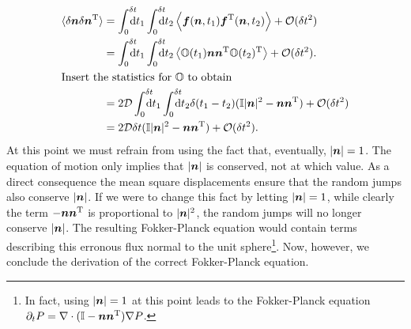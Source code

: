 \documentclass[thesis.tex]{subfiles}
\begin{document}
\begin{align}
	\langle \delta \ve n\delta \ve n\transpose\rangle &= \int_0^{\delta t}\!\!\!\!\!\rd t_1 \int_0^{\delta t}\!\!\!\!\!\rd t_2 \left\langle\ve f(\ve n,t_1) \ve f\transpose(\ve n, t_2)\right\rangle + \mathcal O(\delta t^2)\nn\\
	&= \int_0^{\delta t}\!\!\!\!\!\rd t_1 \int_0^{\delta t}\!\!\!\!\!\rd t_2 \left\langle \ma O(t_1)\ve n\ve n\transpose \ma O(t_2)\transpose \right\rangle + \mathcal O(\delta t^2).\nn\\
	\intertext{Insert the statistics for $\ma O$ to obtain}
	&= 2\mathcal D \int_0^{\delta t}\!\!\!\!\!\rd t_1 \int_0^{\delta t}\!\!\!\!\!\rd t_2 \delta(t_1-t_2)(\ma I|\ve n|^2-\ve n\ve n\transpose) + \mathcal O(\delta t^2)\nn\\
	&= 2\mathcal D \delta t (\ma I|\ve n|^2-\ve n\ve n\transpose) + \mathcal O(\delta t^2).\eqnlab{a2vec}
\end{align}
At this point we must refrain from using the fact that, eventually, $|\mbox{\boldmath$n$}|=1$. The equation of motion  only implies that $|\mbox{\boldmath$n$}|$ is conserved, not at which value. As a direct consequence the mean square displacements  ensure that the random jumps also conserve $|\mbox{\boldmath$n$}|$. If we were to change this fact by letting $|\mbox{\boldmath$n$}|=1$, while clearly the term $-\mbox{\boldmath$n$}\mbox{\boldmath$n$}^{\mathrm T}$ is proportional to  $|\mbox{\boldmath$n$}|^2$, the random jumps will no longer conserve $|\mbox{\boldmath$n$}|$. The resulting Fokker-Planck equation would contain terms describing this erronous flux normal to the unit sphere\footnote{In fact, using $|\mbox{\boldmath$n$}|=1$ at this point leads to the Fokker-Planck equation $\partial_t P = \nabla\cdot(\mathbb{I}-\mbox{\boldmath$n$}\mbox{\boldmath$n$}^{\mathrm T})\nabla P$.}. Now, however, we conclude the derivation of the correct Fokker-Planck equation.
\end{document}
